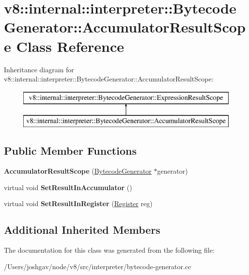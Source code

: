\hypertarget{classv8_1_1internal_1_1interpreter_1_1_bytecode_generator_1_1_accumulator_result_scope}{}\section{v8\+:\+:internal\+:\+:interpreter\+:\+:Bytecode\+Generator\+:\+:Accumulator\+Result\+Scope Class Reference}
\label{classv8_1_1internal_1_1interpreter_1_1_bytecode_generator_1_1_accumulator_result_scope}
Inheritance diagram for v8\+:\+:internal\+:\+:interpreter\+:\+:Bytecode\+Generator\+:\+:Accumulator\+Result\+Scope\+:\begin{figure}[H]
\begin{center}
\leavevmode
\includegraphics[height=2.000000cm]{classv8_1_1internal_1_1interpreter_1_1_bytecode_generator_1_1_accumulator_result_scope}
\end{center}
\end{figure}
\subsection*{Public Member Functions}
\begin{DoxyCompactItemize}
\item 
{\bfseries Accumulator\+Result\+Scope} (\hyperlink{classv8_1_1internal_1_1interpreter_1_1_bytecode_generator}{Bytecode\+Generator} $\ast$generator)\hypertarget{classv8_1_1internal_1_1interpreter_1_1_bytecode_generator_1_1_accumulator_result_scope_afefbdb515862ac85249afcd77f78feb7}{}\label{classv8_1_1internal_1_1interpreter_1_1_bytecode_generator_1_1_accumulator_result_scope_afefbdb515862ac85249afcd77f78feb7}

\item 
virtual void {\bfseries Set\+Result\+In\+Accumulator} ()\hypertarget{classv8_1_1internal_1_1interpreter_1_1_bytecode_generator_1_1_accumulator_result_scope_a61ed8e64cbc3664b03b893cc866b25f1}{}\label{classv8_1_1internal_1_1interpreter_1_1_bytecode_generator_1_1_accumulator_result_scope_a61ed8e64cbc3664b03b893cc866b25f1}

\item 
virtual void {\bfseries Set\+Result\+In\+Register} (\hyperlink{classv8_1_1internal_1_1interpreter_1_1_register}{Register} reg)\hypertarget{classv8_1_1internal_1_1interpreter_1_1_bytecode_generator_1_1_accumulator_result_scope_addfbfaa2866937a51f879cb347f490c8}{}\label{classv8_1_1internal_1_1interpreter_1_1_bytecode_generator_1_1_accumulator_result_scope_addfbfaa2866937a51f879cb347f490c8}

\end{DoxyCompactItemize}
\subsection*{Additional Inherited Members}


The documentation for this class was generated from the following file\+:\begin{DoxyCompactItemize}
\item 
/\+Users/joshgav/node/v8/src/interpreter/bytecode-\/generator.\+cc\end{DoxyCompactItemize}
